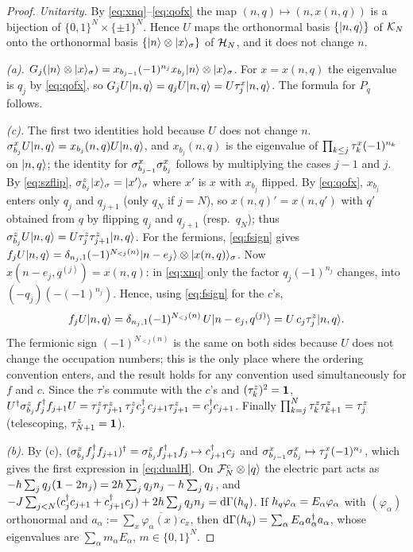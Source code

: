 \begin{proof}
\emph{Unitarity.}  By \eqref{eq:xnq}--\eqref{eq:qofx} the map $(n,q)\mapsto(n,x(n,q))$ is a
bijection of $\{0,1\}^N\times\{\pm1\}^N$.  Hence $U$ maps the orthonormal basis
$\{|n,q\rangle\}$ of $\mathcal{K}_N$ onto the orthonormal basis $\{|n\rangle\otimes|x\rangle_\sigma\}$ of
$\mathcal{H}_N$, and it does not change $n$.

\emph{(a).}  $G_j(|n\rangle\otimes|x\rangle_\sigma)=x_{b_{j-1}}(-1)^{n_j}x_{b_j}|n\rangle\otimes|x\rangle_\sigma$.
For $x=x(n,q)$ the eigenvalue is $q_j$ by \eqref{eq:qofx}, so $G_jU|n,q\rangle=q_jU|n,q\rangle=U\tau^{x}_{j}|n,q\rangle$.
The formula for $P_q$ follows.

\emph{(c).}  The first two identities hold because $U$ does not change $n$.
$\sigma^{x}_{b_{j}}U|n,q\rangle=x_{b_j}(n,q)U|n,q\rangle$, and $x_{b_j}(n,q)$ is the eigenvalue of
$\prod_{k\le j}\tau^{x}_{k}(-1)^{n_k}$ on $|n,q\rangle$; the identity for $\sigma^{x}_{b_{j-1}}\sigma^{x}_{b_{j}}$ follows by
multiplying the cases $j-1$ and $j$.  By \eqref{eq:szflip}, $\sigma^{z}_{b_{j}}|x\rangle_\sigma=|x'\rangle_\sigma$
where $x'$ is $x$ with $x_{b_j}$ flipped.  By \eqref{eq:qofx}, $x_{b_j}$ enters only $q_j$ and
$q_{j+1}$ (only $q_N$ if $j=N$), so $x(n,q)'=x(n,q')$ with $q'$ obtained from $q$ by flipping
$q_j$ and $q_{j+1}$ (resp.\ $q_N$); thus $\sigma^{z}_{b_{j}}U|n,q\rangle=U\tau^{z}_{j}\tau^{z}_{j+1}|n,q\rangle$.  For the
fermions, \eqref{eq:fsign} gives
$f_jU|n,q\rangle=\delta_{n_j,1}(-1)^{N_{<j}(n)}|n-e_j\rangle\otimes|x(n,q)\rangle_\sigma$.  Now
$x(n-e_j,q^{(j)})=x(n,q)$: in \eqref{eq:xnq} only the factor $q_j(-1)^{n_j}$ changes, into
$(-q_j)(-(-1)^{n_j})$.  Hence, using \eqref{eq:fsign} for the $c$'s,
\[
  f_jU|n,q\rangle=\delta_{n_j,1}(-1)^{N_{<j}(n)}\,U|n-e_j,q^{(j)}\rangle=U\,c_j\tau^{z}_{j}|n,q\rangle.
\]
The fermionic sign $(-1)^{N_{<j}(n)}$ is the same on both sides because $U$ does not change the
occupation numbers; this is the only place where the ordering convention enters, and the result
holds for any convention used simultaneously for $f$ and $c$.  Since the $\tau$'s commute with the
$c$'s and $(\tau^{z}_{k})^2=\mathbf{1}$,
$U^\dagger\sigma^{z}_{b_{j}}f_j^\dagger f_{j+1}U=\tau^{z}_{j}\tau^{z}_{j+1}\,\tau^{z}_{j}c_j^\dagger\,c_{j+1}\tau^{z}_{j+1}=c_j^\dagger c_{j+1}$.
Finally $\prod_{k=j}^N\tau^{z}_{k}\tau^{z}_{k+1}=\tau^{z}_{j}$ (telescoping, $\tau^{z}_{N+1}=\mathbf{1}$).

\emph{(b).}  By (c), $(\sigma^{z}_{b_{j}}f_j^\dagger f_{j+1})^\dagger=\sigma^{z}_{b_{j}}f_{j+1}^\dagger f_j\mapsto c_{j+1}^\dagger c_j$
and $\sigma^{x}_{b_{j-1}}\sigma^{x}_{b_{j}}\mapsto\tau^{x}_{j}(-1)^{n_j}$, which gives the first expression in
\eqref{eq:dualH}.  On $\mathcal{F}^c_N\otimes|q\rangle$ the electric part acts as
$-h\sum_jq_j(\mathbf{1}-2n_j)=2h\sum_jq_jn_j-h\sum_jq_j$, and
$-J\sum_{j<N}(c_j^\dagger c_{j+1}+c_{j+1}^\dagger c_j)+2h\sum_jq_jn_j=\mathrm{d}\Gamma(h_{q})$.  If
$h_{q}\varphi_\alpha=E_\alpha\varphi_\alpha$ with $(\varphi_\alpha)$ orthonormal and
$a_\alpha:=\sum_x\overline{\varphi_\alpha(x)}c_x$, then $\mathrm{d}\Gamma(h_{q})=\sum_\alpha E_\alpha a_\alpha^\dagger a_\alpha$,
whose eigenvalues are $\sum_\alpha m_\alpha E_\alpha$, $m\in\{0,1\}^N$.


\end{proof}
